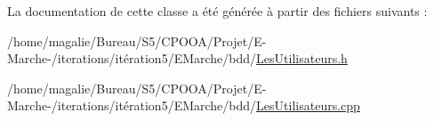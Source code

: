 La documentation de cette classe a été générée à partir des fichiers suivants \-:\begin{DoxyCompactItemize}
\item 
/home/magalie/\-Bureau/\-S5/\-C\-P\-O\-O\-A/\-Projet/\-E-\/\-Marche-\//iterations/itération5/\-E\-Marche/bdd/\hyperlink{_les_utilisateurs_8h}{Les\-Utilisateurs.\-h}\item 
/home/magalie/\-Bureau/\-S5/\-C\-P\-O\-O\-A/\-Projet/\-E-\/\-Marche-\//iterations/itération5/\-E\-Marche/bdd/\hyperlink{_les_utilisateurs_8cpp}{Les\-Utilisateurs.\-cpp}\end{DoxyCompactItemize}
